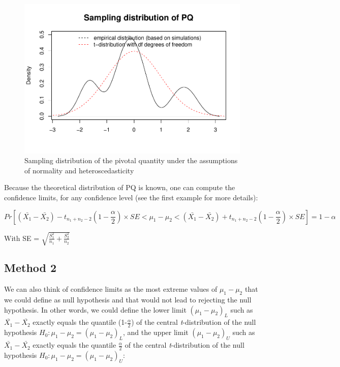 \documentclass[man,floatsintext]{apa6}
\begin{document}
\begin{figure}
\centering
\includegraphics{CI-Reminder_files/figure-latex/SAMPLMEANDIFF2-1.pdf}
\caption{\label{fig:SAMPLMEANDIFF2}Sampling distribution of the pivotal quantity under the assumptions of normality and heteroscedasticity}
\end{figure}

Because the theoretical distribution of PQ is known, one can compute the confidence limits, for any confidence level (see the first example for more details):

\begin{equation} 
Pr[(\bar{X_1}-\bar{X_2}) - t_{n_1+n_2-2}(1-\frac{\alpha}{2}) \times SE < \mu_1-\mu_2 <(\bar{X_1}-\bar{X_2}) +t_{n_1+n_2-2}(1-\frac{\alpha}{2}) \times SE]= 1- \alpha
\label{eq:conflev6}
\end{equation}

With SE = \(\sqrt{\frac{S_1^2}{n_1}+\frac{S_2^2}{n_2}}\)

\hypertarget{method-2}{%
\subsection{Method 2}\label{method-2}}

We can also think of confidence limits as the most extreme values of \(\mu_1-\mu_2\) that we could define as null hypothesis and that would not lead to rejecting the null hypothesis. In other words, we could define the lower limit \((\mu_1-\mu_2)_L\) such as \(\bar{X_1}-\bar{X_2}\) exactly equals the quantile (1-\(\frac{\alpha}{2}\)) of the central \emph{t}-distribution of the null hypothesis \(H_0: \mu_1 - \mu_2 = (\mu_1-\mu_2)_L\), and the upper limit \((\mu_1-\mu_2)_U\) such as \(\bar{X_1}-\bar{X_2}\) exactly equals the quantile \(\frac{\alpha}{2}\) of the central \emph{t}-distribution of the null hypothesis \(H_0: \mu_1 - \mu_2 = (\mu_1-\mu_2)_U\):
\end{document}
